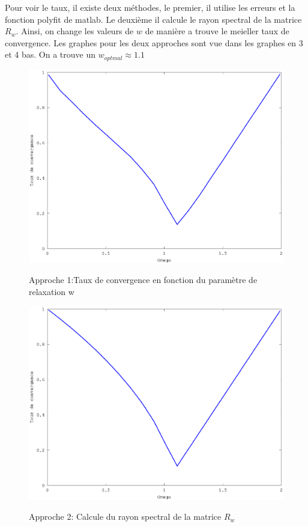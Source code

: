 \documentclass[a4paper,11pt]{article}
\begin{document}
Pour voir le  taux, il existe deux méthodes, le premier,  il utilise les erreurs
et la fonction polyfit de matlab. Le deuxième il calcule le rayon spectral de la
matrice  $R_w$. Ainsi,  on change  les valeurs  de $w$  de manière  a  trouve le
meieller taux de convergence. Les graphes  pour les deux approches sont vue dans
les graphes en 3 et 4 bas.
On a trouve un $w_{optmal}\approx 1.1$ 

\begin{figure}[h!]
  \begin{centering}
    \includegraphics[scale=0.5]{../relaxation_conv2}
    \label{rspro2}
    \par\end{centering}
  \caption{Approche 1:Taux de convergence en fonction du paramètre de relaxation w}
  \label{fig:jacobi-conv}
\end{figure}

\begin{figure}[h!]
  \begin{centering}
    \includegraphics[scale=0.5]{../relaxation_conv_rho}
    \label{rspro2}
    \par\end{centering}
  \caption{Approche 2: Calcule du rayon spectral de la matrice $R_w$}
  \label{fig:jacobi-conv}
\end{figure}
\end{document}
